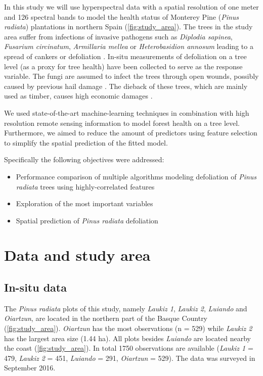\documentclass[review]{elsarticle}
\begin{document}

In this study we will use hyperspectral data with a spatial resolution of one meter and 126 spectral bands to model the health status of Monterey Pine (\textit{Pinus radiata}) plantations in northern Spain (\autoref{fig:study_area}).
The trees in the study area suffer from infections of invasive pathogens such as \textit{Diplodia sapinea}, \textit{Fusarium circinatum}, \textit{Armillaria mellea} or \textit{Heterobasidion annosum} leading to a spread of cankers or defoliation \citep{mesanzaNativeRhizobacteriaBiocontrol2016, iturritxaBiocontrolFusariumCircinatum2017}.
In-situ measurements of defoliation on a tree level (as a proxy for tree health) have been collected to serve as the response variable.
The fungi are assumed to infect the trees through open wounds, possibly caused by previous hail damage \citep{Iturritxa2014}.
The dieback of these trees, which are mainly used as timber, causes high economic damages \citep{ganleyGlobalClimaticRisk2009}.

We used state-of-the-art machine-learning techniques in combination with high resolution remote sensing information to model forest health on a tree level.
Furthermore, we aimed to reduce the amount of predictors using feature selection to simplify the spatial prediction of the fitted model.

\noindent Specifically the following objectives were addressed:

\begin{itemize}
	\item Performance comparison of multiple algorithms modeling defoliation of \textit{Pinus radiata} trees using highly-correlated features
	\item Exploration of the most important variables
	\item Spatial prediction of \textit{Pinus radiata} defoliation
\end{itemize}

\section{Data and study area}

\subsection{In-situ data}

\noindent The \textit{Pinus radiata} plots of this study, namely \textit{Laukiz 1}, \textit{Laukiz 2}, \textit{Luiando} and \textit{Oiartzun}, are located in the northern part of the Basque Country (\autoref{fig:study_area}).
\textit{Oiartzun} has the most observations (n = 529) while \textit{Laukiz 2} has the largest area size (1.44 ha).
All plots besides \textit{Luiando} are located nearby the coast (\autoref{fig:study_area}).
In total 1750 observations are available (\textit{Laukiz 1} = 479, \textit{Laukiz 2} = 451, \textit{Luiando} = 291, \textit{Oiartzun} = 529).
The data was surveyed in September 2016.
\end{document}
